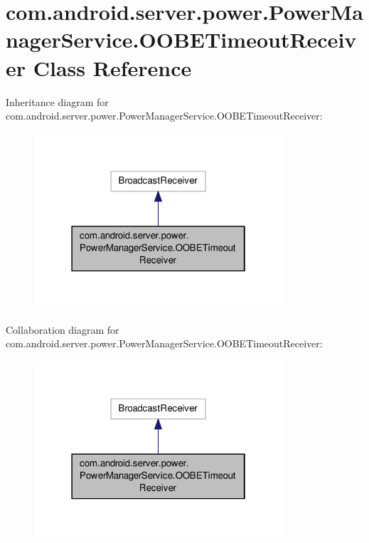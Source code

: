 \hypertarget{classcom_1_1android_1_1server_1_1power_1_1PowerManagerService_1_1OOBETimeoutReceiver}{\section{com.\-android.\-server.\-power.\-Power\-Manager\-Service.\-O\-O\-B\-E\-Timeout\-Receiver Class Reference}
\label{classcom_1_1android_1_1server_1_1power_1_1PowerManagerService_1_1OOBETimeoutReceiver}
}


Inheritance diagram for com.\-android.\-server.\-power.\-Power\-Manager\-Service.\-O\-O\-B\-E\-Timeout\-Receiver\-:
\nopagebreak
\begin{figure}[H]
\begin{center}
\leavevmode
\includegraphics[width=262pt]{classcom_1_1android_1_1server_1_1power_1_1PowerManagerService_1_1OOBETimeoutReceiver__inherit__graph}
\end{center}
\end{figure}


Collaboration diagram for com.\-android.\-server.\-power.\-Power\-Manager\-Service.\-O\-O\-B\-E\-Timeout\-Receiver\-:
\nopagebreak
\begin{figure}[H]
\begin{center}
\leavevmode
\includegraphics[width=262pt]{classcom_1_1android_1_1server_1_1power_1_1PowerManagerService_1_1OOBETimeoutReceiver__coll__graph}
\end{center}
\end{figure}
